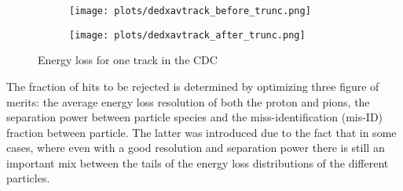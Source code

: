 \begin{figure}[H]
    \centering
    \begin{subfigure}[b]{0.45\textwidth}
        \texttt{[image: plots/dedxavtrack\_before\_trunc.png]}
    \end{subfigure}\hfill
    \begin{subfigure}[b]{0.45\textwidth}
        \texttt{[image: plots/dedxavtrack\_after\_trunc.png]}
    \end{subfigure}
    \caption{Energy loss for one track in the CDC}
    \label{fig.3.3}
\end{figure}
The fraction of hits to be rejected is determined by optimizing three figure of merits: the average energy loss resolution of both the proton and pions, the separation power between particle species and the miss-identification (mis-ID) fraction between particle. The latter was introduced due to the fact that in some cases, where even with a good resolution and separation power there is still an important mix between the tails of the energy loss distributions of the different particles.

